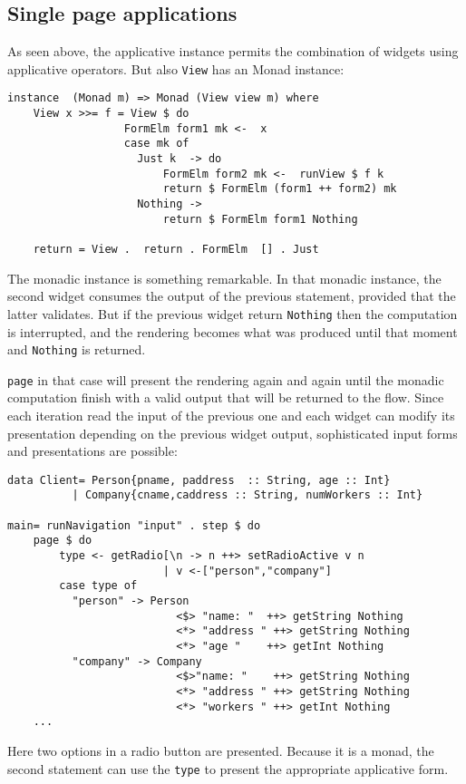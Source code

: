 \documentclass{tmr}
\begin{document}
\subsection{Single page applications} 

As seen above, the applicative instance permits the combination of widgets using applicative operators. But also {\tt View} has an Monad instance: 
 
{\tt 
 
\begin{verbatim} 
instance  (Monad m) => Monad (View view m) where 
    View x >>= f = View $ do 
                  FormElm form1 mk <-  x 
                  case mk of 
                    Just k  -> do 
                        FormElm form2 mk <-  runView $ f k 
                        return $ FormElm (form1 ++ form2) mk 
                    Nothing -> 
                        return $ FormElm form1 Nothing 
 
    return = View .  return . FormElm  [] . Just 
\end{verbatim} 
 
} 
 
The monadic instance is something remarkable. In that monadic instance, the second widget consumes the output of the previous statement, provided that the latter validates. But if the previous widget return {\tt Nothing} then the computation is interrupted, and the rendering becomes what was produced until that moment and {\tt Nothing} is returned. 
 
{\tt page} in that case will present the rendering again and again until the monadic computation finish with a valid output that will be returned to the flow. Since each iteration read the input of the previous one and each widget can modify its presentation depending on the previous widget output, sophisticated input forms and presentations are possible: 
{\tt 
 
\begin{verbatim} 
data Client= Person{pname, paddress  :: String, age :: Int} 
          | Company{cname,caddress :: String, numWorkers :: Int} 
 
main= runNavigation "input" . step $ do 
    page $ do 
        type <- getRadio[\n -> n ++> setRadioActive v n 
                        | v <-["person","company"] 
        case type of 
          "person" -> Person 
                          <$> "name: "  ++> getString Nothing 
                          <*> "address " ++> getString Nothing 
                          <*> "age "    ++> getInt Nothing 
          "company" -> Company 
                          <$>"name: "    ++> getString Nothing 
                          <*> "address " ++> getString Nothing 
                          <*> "workers " ++> getInt Nothing 
    ... 
\end{verbatim} 
 
} 
Here two options in a radio button are presented. Because it is a  monad, the second statement can use the {\tt type} to present the  appropriate applicative form. 
 
\end{document}
